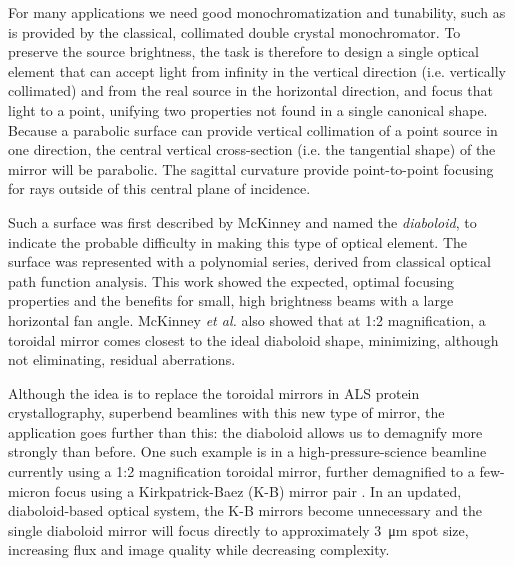 \documentclass{iucr}       %
\begin{document}
For many applications we need good monochromatization and tunability, such as is provided by the classical, collimated double crystal monochromator. To preserve the source brightness, the task is therefore to design a single optical element that can accept light from infinity in the vertical direction (i.e. vertically collimated) and from the real source in the horizontal direction, and focus that light to a point, unifying two properties not found in a single canonical shape.
Because a parabolic surface can provide vertical collimation of a point source in one direction, the central vertical cross-section (i.e. the tangential shape) of the mirror will be parabolic. The sagittal curvature provide point-to-point focusing for rays outside of this central plane of incidence.

Such a surface was first described by McKinney \cite{McKinneySPIE2009} and named the \emph{diaboloid}, to indicate the probable difficulty in making this type of optical element. The surface was represented with a polynomial series, derived from classical optical path function analysis. This work showed the expected, optimal focusing properties and the benefits for small, high brightness beams with a large horizontal fan angle. McKinney {\it et al.} also showed that at 1:2 magnification, a toroidal mirror comes closest to the ideal diaboloid shape, minimizing, although not eliminating, residual aberrations.

Although the idea is to replace the toroidal mirrors in ALS protein crystallography, superbend beamlines with this new type of mirror, the application goes further than this: the diaboloid allows us to demagnify more strongly than before. One such example is in a high-pressure-science beamline currently using a 1:2 magnification toroidal mirror, further demagnified to a few-micron focus using a Kirkpatrick-Baez (K-B) mirror pair \cite{Kirkpatrick1946}. In an updated, diaboloid-based optical system, the K-B mirrors become unnecessary and the single diaboloid mirror will focus directly to approximately \SI{3}{\micro\meter} spot size, increasing flux and image quality while decreasing complexity.
\end{document}
